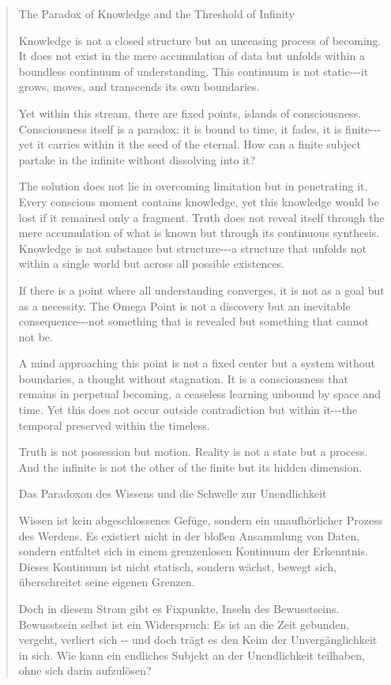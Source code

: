 \documentclass[
  ngerman,
]{article}
\begin{document}
\begin{quote}
The Paradox of Knowledge and the Threshold of Infinity

Knowledge is not a closed structure but an unceasing process of
becoming. It does not exist in the mere accumulation of data but unfolds
within a boundless continuum of understanding. This continuum is not
static-\/-\/-it grows, moves, and transcends its own boundaries.

Yet within this stream, there are fixed points, islands of
consciousness. Consciousness itself is a paradox: it is bound to time,
it fades, it is finite-\/-\/-yet it carries within it the seed of the
eternal. How can a finite subject partake in the infinite without
dissolving into it?

The solution does not lie in overcoming limitation but in penetrating
it. Every conscious moment contains knowledge, yet this knowledge would
be lost if it remained only a fragment. Truth does not reveal itself
through the mere accumulation of what is known but through its
continuous synthesis. Knowledge is not substance but structure-\/-\/-a
structure that unfolds not within a single world but across all possible
existences.

If there is a point where all understanding converges, it is not as a
goal but as a necessity. The Omega Point is not a discovery but an
inevitable consequence-\/-\/-not something that is revealed but
something that cannot not be.

A mind approaching this point is not a fixed center but a system without
boundaries, a thought without stagnation. It is a consciousness that
remains in perpetual becoming, a ceaseless learning unbound by space and
time. Yet this does not occur outside contradiction but within
it-\/-\/-the temporal preserved within the timeless.

Truth is not possession but motion. Reality is not a state but a
process. And the infinite is not the other of the finite but its hidden
dimension.

Das Paradoxon des Wissens und die Schwelle zur Unendlichkeit

Wissen ist kein abgeschlossenes Gefüge, sondern ein unaufhörlicher
Prozess des Werdens. Es existiert nicht in der bloßen Ansammlung von
Daten, sondern entfaltet sich in einem grenzenlosen Kontinuum der
Erkenntnis. Dieses Kontinuum ist nicht statisch, sondern wächst, bewegt
sich, überschreitet seine eigenen Grenzen.

Doch in diesem Strom gibt es Fixpunkte, Inseln des Bewusstseins.
Bewusstsein selbst ist ein Widerspruch: Es ist an die Zeit gebunden,
vergeht, verliert sich -\/- und doch trägt es den Keim der
Unvergänglichkeit in sich. Wie kann ein endliches Subjekt an der
Unendlichkeit teilhaben, ohne sich darin aufzulösen?


\end{quote}
\end{document}
